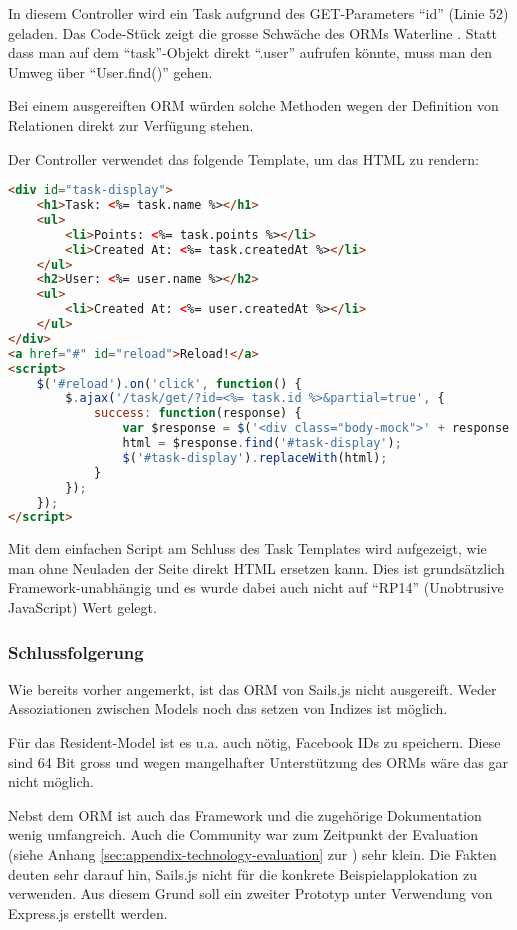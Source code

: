In diesem Controller wird ein Task aufgrund des GET-Parameters ``id'' (Linie 52) geladen. Das Code-Stück zeigt die grosse Schwäche des ORMs Waterline \cite{Waterline}. Statt dass man auf dem ``task''-Objekt direkt ``.user'' aufrufen könnte, muss man den Umweg über ``User.find()'' gehen.

Bei einem ausgereiften ORM würden solche Methoden wegen der Definition von Relationen direkt zur Verfügung stehen.

Der Controller verwendet das folgende Template, um das HTML zu rendern:

\begin{lstlisting}[language=HTML, caption=Task Template]
<div id="task-display">
	<h1>Task: <%= task.name %></h1>
	<ul>
		<li>Points: <%= task.points %></li>
		<li>Created At: <%= task.createdAt %></li>
	</ul>
	<h2>User: <%= user.name %></h2>
	<ul>
		<li>Created At: <%= user.createdAt %></li>
	</ul>
</div>
<a href="#" id="reload">Reload!</a>
<script>
	$('#reload').on('click', function() {
		$.ajax('/task/get/?id=<%= task.id %>&partial=true', {
			success: function(response) {
				var $response = $('<div class="body-mock">' + response + '</div>');
				html = $response.find('#task-display');
				$('#task-display').replaceWith(html);
			}
		});
	});
</script>
\end{lstlisting}

Mit dem einfachen Script am Schluss des Task Templates wird aufgezeigt, wie man ohne Neuladen der Seite direkt HTML ersetzen kann. Dies ist grundsätzlich Framework-unabhängig und es wurde dabei auch nicht auf ``RP14'' (Unobtrusive JavaScript) Wert gelegt.

\subsubsection*{Schlussfolgerung}

Wie bereits vorher angemerkt, ist das ORM von Sails.js nicht ausgereift. Weder Assoziationen zwischen Models \cite{SailsjsModelAssociations} noch das setzen von Indizes ist möglich.

Für das Resident-Model ist es u.a. auch nötig, Facebook IDs zu speichern. Diese sind 64 Bit gross und wegen mangelhafter Unterstützung des ORMs wäre das gar nicht möglich.

Nebst dem ORM ist auch das Framework und die zugehörige Dokumentation wenig umfangreich. Auch die Community war zum Zeitpunkt der Evaluation (siehe Anhang \ref{sec:appendix-technology-evaluation} zur ) sehr klein. Die Fakten deuten sehr darauf hin, Sails.js nicht für die konkrete Beispielapplokation zu verwenden. Aus diesem Grund soll ein zweiter Prototyp unter Verwendung von Express.js erstellt werden.